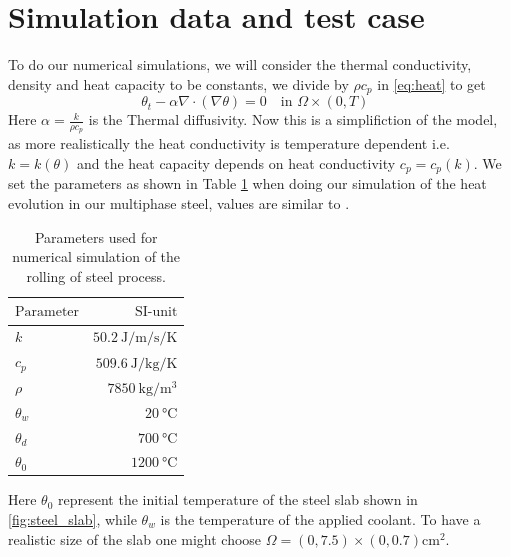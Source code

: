 \section{Simulation data and test case}

To do our numerical simulations, we will consider the thermal conductivity, density and heat capacity to be constants, we divide by $\rho c_p$ in \eqref{eq:heat} to get 
\begin{equation*}
    \theta_t - \alpha \nabla \cdot (\nabla \theta) = 0 \quad \text{in $\Omega \times (0,T)$ }
\end{equation*}
Here $\alpha = \frac{k}{\rho c_p}$ is the Thermal diffusivity. Now this is a simplifiction of the model, as more realistically the heat conductivity is temperature dependent i.e. $k = k(\theta)$ and the heat capacity depends on heat conductivity $c_p = c_p(k)$. We set the parameters as shown in Table \ref{tab:chosenParam} when doing our simulation of the heat evolution in our multiphase steel, values are similar to \cite{DPSteel}. 
\begin{table}[h]
    \centering
    \caption{Parameters used for numerical simulation of the rolling of steel process.}
    \begin{tabular}{@{}lr@{}} \toprule
    $\text{Parameter}$ & $\text{SI-unit}$ \\
    \midrule
       $k$& $\SI{50.2}{\joule\per\metre\per\second\per\kelvin}$ \\
        $c_p$ & $\SI{509.6}{\joule\per\kilogram\per\kelvin}$ \\
        $\rho$ & $\SI{7850}{\kilogram\per\metre\cubed}$ \\
        $\theta_w$ & $\SI{20}{\celsius}$ \\
        $\theta_d$ & $\SI{700}{\celsius}$ \\
        $\theta_0$ & $\SI{1200}{\celsius}$ \\ \bottomrule
    \end{tabular}
    \label{tab:chosenParam}
\end{table}
Here $\theta_0$ represent the initial temperature of the steel slab shown in \ref{fig:steel_slab}, while $\theta_w$ is the temperature of the applied coolant. To have a realistic size of the slab one might choose $\Omega = (0,7.5)\times(0,0.7) \text{cm}^2$.

